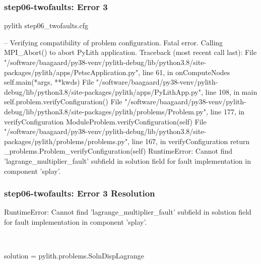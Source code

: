 \documentclass[aspectratio=169]{beamer}
\begin{document}
\begin{frame}[fragile]
  \frametitle{{\ttfamily step06-twofaults}: Error 3}

\begin{bashcode}
pylith step06_twofaults.cfg

 -- Verifying compatibility of problem configuration.
Fatal error. Calling MPI_Abort() to abort PyLith application.
Traceback (most recent call last):
  File "/software/baagaard/py38-venv/pylith-debug/lib/python3.8/site-packages/pylith/apps/PetscApplication.py", line 61, in onComputeNodes
    self.main(*args, **kwds)
  File "/software/baagaard/py38-venv/pylith-debug/lib/python3.8/site-packages/pylith/apps/PyLithApp.py", line 108, in main
    self.problem.verifyConfiguration()
  File "/software/baagaard/py38-venv/pylith-debug/lib/python3.8/site-packages/pylith/problems/Problem.py", line 177, in verifyConfiguration
    ModuleProblem.verifyConfiguration(self)
  File "/software/baagaard/py38-venv/pylith-debug/lib/python3.8/site-packages/pylith/problems/problems.py", line 167, in verifyConfiguration
    return _problems.Problem_verifyConfiguration(self)
RuntimeError: Cannot find 'lagrange_multiplier_fault' subfield in solution field for fault implementation in component 'splay'.
\end{bashcode}

\end{frame}


\begin{frame}[t,fragile]
  \frametitle{{\ttfamily step06-twofaults}: Error 3 Resolution}

  \tserror
  \begin{bashcode}
RuntimeError: Cannot find 'lagrange_multiplier_fault' subfield in solution field for fault implementation in component 'splay'.
  \end{bashcode}

  \pause\\[1pt]

  \begin{cfgcode}
    solution = pylith.problems.SolnDispLagrange
  \end{cfgcode}

\end{frame}
\end{document}
